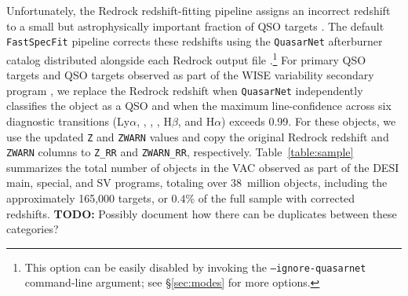 \documentclass[modern,linenumbers]{aastex701}
\newcommand{\todo}[1]{{\color{red}\textbf{TODO:} #1}}
\newcommand{\fastspecfit}{\texttt{FastSpecFit}}
\newcommand{\mgii}{\ion{Mg}{2}}
\newcommand{\ha}{H\ensuremath{\alpha}}
\newcommand{\hb}{H\ensuremath{\beta}}
\begin{document}
Unfortunately, the Redrock redshift-fitting pipeline assigns an
incorrect redshift to a small but astrophysically important fraction
of QSO targets \citep{chaussidon23a, adame25e}. The default
\fastspecfit{} pipeline corrects these redshifts using the
\texttt{QuasarNet} afterburner catalog \citep{green25a} distributed
alongside each Redrock output file \citep{desi-collaboration24d,
  desi-collaboration26a}.\footnote{This option can be easily disabled
by invoking the \texttt{--ignore-quasarnet} command-line argument; see
\S\ref{sec:modes} for more options.}  For primary QSO targets and QSO
targets observed as part of the WISE variability secondary program
\citep{chaussidon23a, myers23a}, we replace the Redrock redshift when
\texttt{QuasarNet} independently classifies the object as a QSO and
when the maximum line-confidence across six diagnostic transitions
(Ly$\alpha$, , , \mgii, \hb, and \ha) exceeds
0.99. For these objects, we use the updated \texttt{Z} and
\texttt{ZWARN} values and copy the original Redrock redshift and
\texttt{ZWARN} columns to \texttt{Z\_RR} and \texttt{ZWARN\_RR},
respectively. Table~\ref{table:sample} summarizes the total number of
objects in the VAC observed as part of the DESI main, special, and SV
programs, totaling over 38~million objects, including the
approximately 165,000 targets, or $0.4\%$ of the full sample with
corrected redshifts. \todo{Possibly document how there can be
  duplicates between these categories?}
\end{document}

